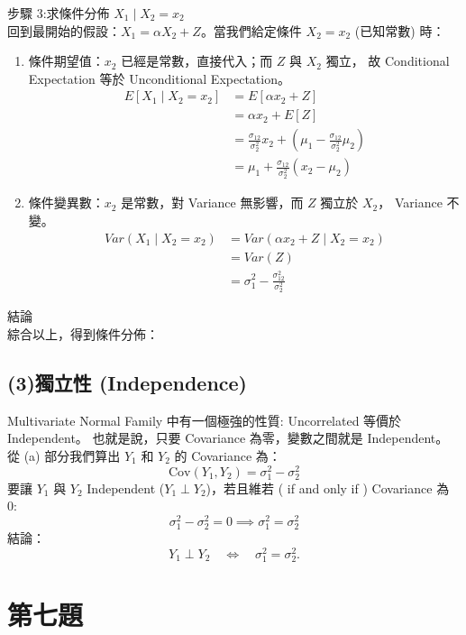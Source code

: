 \documentclass{article}
\begin{document}
步驟 3:求條件分佈 $X_1 \mid X_2 = x_2$\\
回到最開始的假設：$X_1 = \alpha X_2 + Z$。當我們給定條件 $X_2 = x_2$ (已知常數) 時：
\begin{enumerate}
    \item 條件期望值：$x_2$ 已經是常數，直接代入；而 $Z$ 與 $X_2$ 獨立，
    故 Conditional Expectation 等於 Unconditional Expectation。
    \begin{align*}
        E[X_1 \mid X_2=x_2] &= E[\alpha x_2 + Z] \\
        &= \alpha x_2 + E[Z] \\
        &= \frac{\sigma_{12}}{\sigma_2^2} x_2 + \left(\mu_1 - \frac{\sigma_{12}}{\sigma_2^2}\mu_2\right) \\
        &= \boxed{\mu_1 + \frac{\sigma_{12}}{\sigma_2^2}(x_2 - \mu_2)}
    \end{align*}
    \item 條件變異數：$x_2$ 是常數，對 Variance 無影響，而 $Z$ 獨立於 $X_2$， Variance 不變。
    \begin{align*}
        Var(X_1 \mid X_2=x_2) &= Var(\alpha x_2 + Z \mid X_2=x_2) \\
        &= Var(Z) \\
        &= \boxed{\sigma_1^2 - \frac{\sigma_{12}^2}{\sigma_2^2}}
    \end{align*}
\end{enumerate}
結論\\
綜合以上，得到條件分佈：
\begin{center}
\end{center}

\subsection*{(3)獨立性 (Independence)}
Multivariate Normal Family 中有一個極強的性質: Uncorrelated 等價於 Independent。
也就是說，只要 Covariance 為零，變數之間就是 Independent。
從 (a) 部分我們算出 $Y_1$ 和 $Y_2$ 的 Covariance 為：
$$\mathrm{Cov}(Y_1, Y_2) = \sigma_1^2 - \sigma_2^2$$
要讓 $Y_1$ 與 $Y_2$ Independent ($Y_1 \perp Y_2$)，若且維若 ( if and only if ) 
Covariance 為 0:
$$\sigma_1^2 - \sigma_2^2 = 0 \implies \sigma_1^2 = \sigma_2^2$$
結論：
$$\boxed{~Y_1 \perp Y_2 \quad\Longleftrightarrow\quad \sigma_1^2=\sigma_2^2.~}$$
\hrulefill

\section*{第七題}
\end{document}
